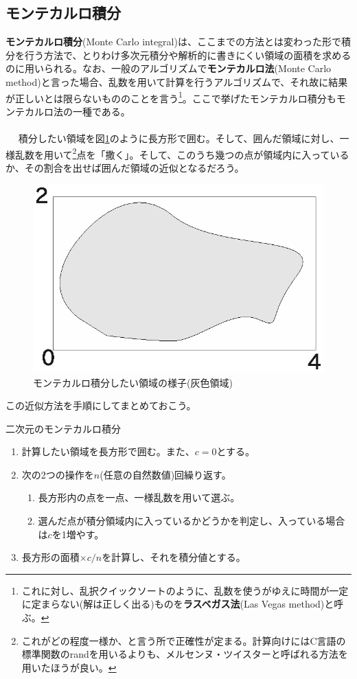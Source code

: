 \subsection{モンテカルロ積分}
\textbf{モンテカルロ積分}(Monte Carlo integral)は、ここまでの方法とは変わった形で積分を行う方法で、とりわけ多次元積分や解析的に書きにくい領域の面積を求めるのに用いられる。なお、一般のアルゴリズムで\textbf{モンテカルロ法}(Monte Carlo method)と言った場合、乱数を用いて計算を行うアルゴリズムで、それ故に結果が正しいとは限らないもののことを言う\footnote{これに対し、乱択クイックソートのように、乱数を使うがゆえに時間が一定に定まらない(解は正しく出る)ものを\textbf{ラスベガス法}(Las Vegas method)と呼ぶ。}。ここで挙げたモンテカルロ積分もモンテカルロ法の一種である。
\\ \\　
積分したい領域を図\ref{monte}のように長方形で囲む。そして、囲んだ領域に対し、一様乱数を用いて\footnote{これがどの程度一様か、と言う所で正確性が定まる。計算向けにはC言語の標準関数のrandを用いるよりも、メルセンヌ・ツイスターと呼ばれる方法を用いたほうが良い。}点を「撒く」。そして、このうち幾つの点が領域内に入っているか、その割合を出せば囲んだ領域の近似となるだろう。
\begin{figure}[htb]
\centering
\includegraphics[width=0.6\linewidth,keepaspectratio]{fig15_3.eps}
\caption{モンテカルロ積分したい領域の様子(灰色領域)}\label{monte}
\end{figure}

この近似方法を手順にしてまとめておこう。
\begin{itembox}[l]{二次元のモンテカルロ積分}
\begin{enumerate}
\item 計算したい領域を長方形で囲む。また、$c=0$とする。
\item 次の2つの操作を$n$(任意の自然数値)回繰り返す。
\begin{enumerate}[(1)]
\item 長方形内の点を一点、一様乱数を用いて選ぶ。
\item 選んだ点が積分領域内に入っているかどうかを判定し、入っている場合は$c$を1増やす。
\end{enumerate}
\item 長方形の面積$\times c/n$を計算し、それを積分値とする。
\end{enumerate}
\end{itembox}

